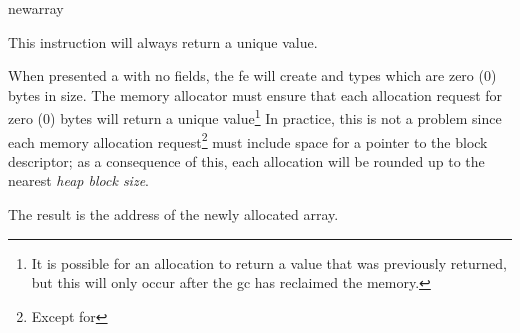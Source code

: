 \begin{instruction}{newarray}

  \begin{notes}
    This instruction will always return a unique value.  

    When presented a  with no fields, the \ac{fe} will
    create  and  types which are zero (0)
    bytes in size.  The memory allocator must ensure that each
    allocation request for zero (0) bytes will return a unique
    value\footnote{It is possible for an allocation to return a value
      that was previously returned, but this will only occur after the
      \ac{gc} has reclaimed the memory.}  In practice, this is not a
    problem since each memory allocation request\footnote{Except for
      } must include space for a pointer to the block
    descriptor; as a consequence of this, each allocation will be
    rounded up to the nearest \emph{heap block size}.
  \end{notes}

  \begin{results}
  \item The result is the address of the newly allocated array.
  \end{results}

  \begin{operands}
  \item {}
  \end{operands}
\end{instruction}

